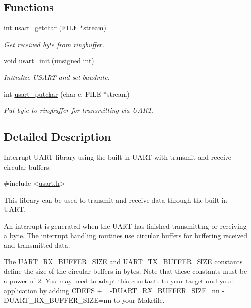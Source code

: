 \subsection*{Functions}
\begin{DoxyCompactItemize}
\item 
int \hyperlink{group__pfleury__uart_ga927612c41ef22fe455959b428e7f33cc}{usart\-\_\-getchar} (F\-I\-L\-E $\ast$stream)
\begin{DoxyCompactList}\small\item\em Get received byte from ringbuffer. \end{DoxyCompactList}\item 
void \hyperlink{group__pfleury__uart_ga31c0af992d7fc4db12191bb47a416da9}{usart\-\_\-init} (unsigned int)
\begin{DoxyCompactList}\small\item\em Initialize U\-S\-A\-R\-T and set baudrate. \end{DoxyCompactList}\item 
int \hyperlink{group__pfleury__uart_ga5db1b15d2f108232a6162b87c9fb352e}{usart\-\_\-putchar} (char c, F\-I\-L\-E $\ast$stream)
\begin{DoxyCompactList}\small\item\em Put byte to ringbuffer for transmitting via U\-A\-R\-T. \end{DoxyCompactList}\end{DoxyCompactItemize}


\subsection{Detailed Description}
Interrupt U\-A\-R\-T library using the built-\/in U\-A\-R\-T with transmit and receive circular buffers. 
\begin{DoxyCode}
\textcolor{preprocessor}{#include <\hyperlink{usart_8h}{usart.h}>} 
\end{DoxyCode}


This library can be used to transmit and receive data through the built in U\-A\-R\-T.

An interrupt is generated when the U\-A\-R\-T has finished transmitting or receiving a byte. The interrupt handling routines use circular buffers for buffering received and transmitted data.

The U\-A\-R\-T\-\_\-\-R\-X\-\_\-\-B\-U\-F\-F\-E\-R\-\_\-\-S\-I\-Z\-E and U\-A\-R\-T\-\_\-\-T\-X\-\_\-\-B\-U\-F\-F\-E\-R\-\_\-\-S\-I\-Z\-E constants define the size of the circular buffers in bytes. Note that these constants must be a power of 2. You may need to adapt this constants to your target and your application by adding C\-D\-E\-F\-S += -\/\-D\-U\-A\-R\-T\-\_\-\-R\-X\-\_\-\-B\-U\-F\-F\-E\-R\-\_\-\-S\-I\-Z\-E=nn -\/\-D\-U\-A\-R\-T\-\_\-\-R\-X\-\_\-\-B\-U\-F\-F\-E\-R\-\_\-\-S\-I\-Z\-E=nn to your Makefile.


